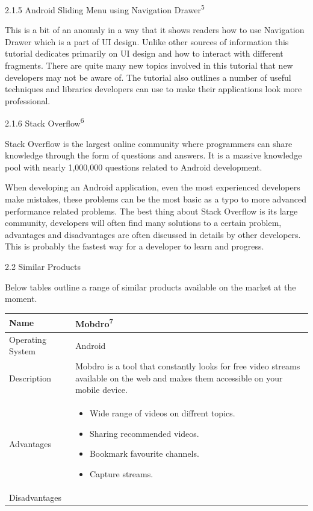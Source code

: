 \documentclass{article}
\begin{document}
\begin{flushleft}
{\large 2.1.5 Android Sliding Menu using Navigation Drawer\textsuperscript{5}}\par
This is a bit of an anomaly in a way that it shows readers how to use Navigation Drawer which is a part of UI design. Unlike other sources of information this tutorial dedicates primarily on UI design and how to interact with different fragments. There are quite many new topics involved in this tutorial that new developers may not be aware of. The tutorial also outlines a number of useful techniques and libraries developers can use to make their applications look more professional.\par
{\large 2.1.6 Stack Overflow\textsuperscript{6}}\par
Stack Overflow is the largest online community where programmers can share knowledge through the form of questions and answers. It is a massive knowledge pool with nearly 1,000,000 questions related to Android development.\par
When developing an Android application, even the most experienced developers make mistakes, these problems can be the most basic as a typo to more advanced performance related problems. The best thing about Stack Overflow is its large community, developers will often find many solutions to a certain problem, advantages and disadvantages are often discussed in details by other developers. This is probably the fastest way for a developer to learn and progress.\par
{\Large 2.2 Similar Products}\par
Below tables outline a range of similar products available on the market at the moment.
\begin{tabular}{| p{2.2cm} | p{9cm} |}
\hline
Name & Mobdro\textsuperscript{7}\\
\hline
Operating System & Android\\
\hline
Description & Mobdro is a tool that constantly looks for free video streams available on the web and makes them accessible on your mobile device.\\
\hline
Advantages & 
\begin{itemize} 
	\item Wide range of videos on diffrent topics.
	\item Sharing recommended videos.
	\item Bookmark favourite channels.
	\item Capture streams.
\end{itemize}\\
\hline
Disadvantages &

\end{tabular}
\end{flushleft}
\end{document}
